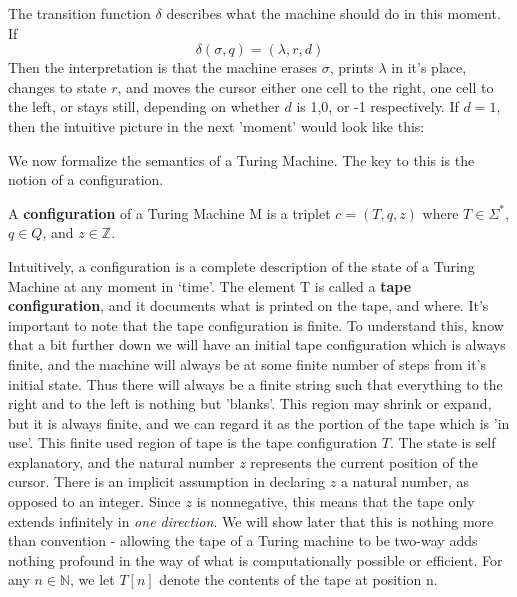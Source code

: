 The transition function $\delta$ describes what the machine should do in this moment. If 
\[\delta(\sigma,q)=(\lambda,r,d)\]
Then the interpretation is that the machine erases $\sigma$, prints $\lambda$ in it's place, changes to state $r$, and moves the cursor either one cell to the right, one cell to the left, or stays still, depending on whether $d$ is 1,0, or -1 respectively. If $d=1$, then the intuitive picture in the next 'moment' would look like this:
\vspace{1cm}
\begin{center}
\end{center}
We now formalize the semantics of a Turing Machine. The key to this is the notion of a configuration.
\begin{definition}
A \textbf{configuration} of a Turing Machine M is a triplet $c=(T,q,z)$ where $T\in\Sigma^*$, $q\in Q$, and $z\in\mathbb{Z}$.  
\end{definition}
Intuitively, a configuration is a complete description of the state of a Turing Machine at any moment in `time'. The element T is called a \textbf{tape configuration}, and it documents what is printed on the tape, and where. It's important to note that the tape configuration is finite. To understand this, know that a bit further down we will have an initial tape configuration which is always finite, and the machine will always be at some finite number of steps from it's initial state. Thus there will always be a finite string such that everything to the right and to the left is nothing but 'blanks'. This region may shrink or expand, but it is always finite, and we can regard it as the portion of the tape which is 'in use'. This finite used region of tape is the tape configuration $T$. The state is self explanatory, and the natural number $z$ represents the current position of the cursor. There is an implicit assumption in declaring $z$ a natural number, as opposed to an integer. Since $z$ is nonnegative, this means that the tape only extends infinitely in \textit{one direction}. We will show later that this is nothing more than convention - allowing the tape of a Turing machine to be two-way adds nothing profound in the way of what is computationally possible or efficient. For any $n\in\mathbb{N}$, we let $T[n]$ denote the contents of the tape at position n.
